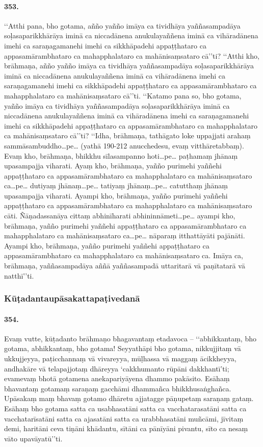 \paragraph{353.} ‘‘Atthi pana, bho gotama, añño yañño imāya ca tividhāya yaññasampadāya soḷasaparikkhārāya iminā ca niccadānena anukulayaññena iminā ca vihāradānena imehi ca saraṇagamanehi imehi ca sikkhāpadehi appaṭṭhataro ca appasamārambhataro ca mahapphalataro ca mahānisaṃsataro cā’’ti? ‘‘Atthi kho, brāhmaṇa, añño yañño imāya ca tividhāya yaññasampadāya soḷasaparikkhārāya iminā ca niccadānena anukulayaññena iminā ca vihāradānena imehi ca saraṇagamanehi imehi ca sikkhāpadehi appaṭṭhataro ca appasamārambhataro ca mahapphalataro ca mahānisaṃsataro cā’’ti. ‘‘Katamo pana so, bho gotama, yañño imāya ca tividhāya yaññasampadāya soḷasaparikkhārāya iminā ca niccadānena anukulayaññena iminā ca vihāradānena imehi ca saraṇagamanehi imehi ca sikkhāpadehi appaṭṭhataro ca appasamārambhataro ca mahapphalataro ca mahānisaṃsataro cā’’ti? ‘‘Idha, brāhmaṇa, tathāgato loke uppajjati arahaṃ sammāsambuddho…pe… (yathā 190-212 anucchedesu, evaṃ vitthāretabbaṃ). Evaṃ kho, brāhmaṇa, bhikkhu sīlasampanno hoti…pe… paṭhamaṃ jhānaṃ upasampajja viharati. Ayaṃ kho, brāhmaṇa, yañño purimehi yaññehi appaṭṭhataro ca appasamārambhataro ca mahapphalataro ca mahānisaṃsataro ca…pe… dutiyaṃ jhānaṃ…pe… tatiyaṃ jhānaṃ…pe… catutthaṃ jhānaṃ upasampajja viharati. Ayampi kho, brāhmaṇa, yañño purimehi yaññehi appaṭṭhataro ca appasamārambhataro ca mahapphalataro ca mahānisaṃsataro cāti. Ñāṇadassanāya cittaṃ abhinīharati abhininnāmeti…pe… ayampi kho, brāhmaṇa, yañño purimehi yaññehi appaṭṭhataro ca appasamārambhataro ca mahapphalataro ca mahānisaṃsataro ca…pe… nāparaṃ itthattāyāti pajānāti. Ayampi kho, brāhmaṇa, yañño purimehi yaññehi appaṭṭhataro ca appasamārambhataro ca mahapphalataro ca mahānisaṃsataro ca. Imāya ca, brāhmaṇa, yaññasampadāya aññā yaññasampadā uttaritarā vā paṇītatarā vā natthī’’ti.

\subsubsection{Kūṭadantaupāsakattapaṭivedanā}

\paragraph{354.} Evaṃ vutte, kūṭadanto brāhmaṇo bhagavantaṃ etadavoca – ‘‘abhikkantaṃ, bho gotama, abhikkantaṃ, bho gotama! Seyyathāpi bho gotama, nikkujjitaṃ vā ukkujjeyya, paṭicchannaṃ vā vivareyya, mūḷhassa vā maggaṃ ācikkheyya, andhakāre vā telapajjotaṃ dhāreyya ‘cakkhumanto rūpāni dakkhantī’ti; evamevaṃ bhotā gotamena anekapariyāyena dhammo pakāsito. Esāhaṃ bhavantaṃ gotamaṃ saraṇaṃ gacchāmi dhammañca bhikkhusaṅghañca. Upāsakaṃ maṃ bhavaṃ gotamo dhāretu ajjatagge pāṇupetaṃ saraṇaṃ gataṃ. Esāhaṃ bho gotama satta ca usabhasatāni satta ca vacchatarasatāni satta ca vacchatarīsatāni satta ca ajasatāni satta ca urabbhasatāni muñcāmi, jīvitaṃ demi, haritāni ceva tiṇāni khādantu, sītāni ca pānīyāni pivantu, sīto ca nesaṃ vāto upavāyatū’’ti.

